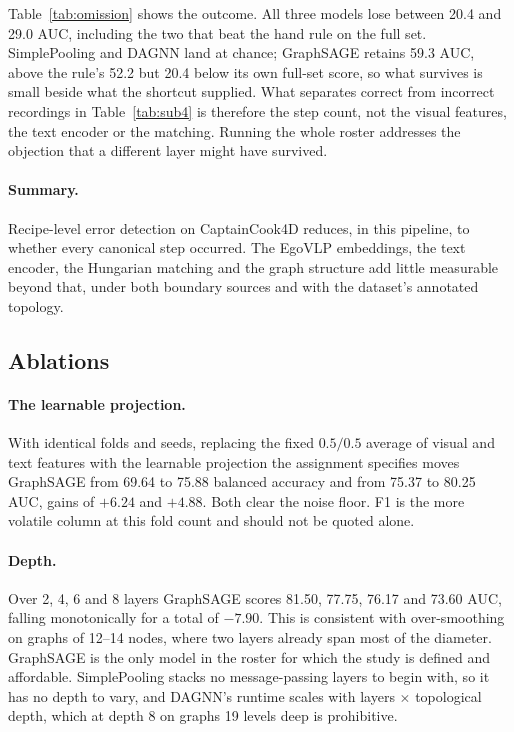 \documentclass[10pt,twocolumn,letterpaper]{article}
\begin{document}
Table~\ref{tab:omission} shows the outcome. All three models lose between 20.4 and
29.0 AUC, including the two that beat the hand rule on the full set. SimplePooling
and DAGNN land at chance; GraphSAGE retains 59.3 AUC, above the rule's 52.2 but
20.4 below its own full-set score, so what survives is small beside what the
shortcut supplied. What separates correct from incorrect recordings in
Table~\ref{tab:sub4} is therefore the step count, not the visual features, the text
encoder or the matching. Running the whole roster addresses the objection that a
different layer might have survived.

\paragraph{Summary.} Recipe-level error detection on CaptainCook4D reduces, in this
pipeline, to whether every canonical step occurred. The EgoVLP embeddings, the text
encoder, the Hungarian matching and the graph structure add little measurable
beyond that, under both boundary sources and with the dataset's annotated
topology.

\subsection{Ablations}

\paragraph{The learnable projection.} With identical folds and seeds, replacing
the fixed $0.5/0.5$ average of visual and text features with the learnable
projection the assignment specifies moves GraphSAGE from 69.64 to 75.88 balanced
accuracy and from 75.37 to 80.25 AUC, gains of $+6.24$ and $+4.88$. Both clear the
noise floor. F1 is the more volatile column at this fold count and should not be
quoted alone.

\paragraph{Depth.} Over 2, 4, 6 and 8 layers GraphSAGE scores 81.50, 77.75, 76.17
and 73.60 AUC, falling monotonically for a total of $-7.90$. This is consistent with
over-smoothing on graphs of 12--14 nodes, where two layers already span most of
the diameter. GraphSAGE is the only model in the roster for which the study is
defined and affordable. SimplePooling stacks no message-passing layers to begin
with, so it has no depth to vary, and DAGNN's runtime scales with layers $\times$
topological depth, which at depth 8 on graphs 19 levels deep is prohibitive.
\end{document}
